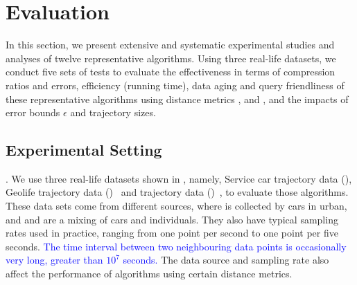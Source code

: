 \section{Evaluation} %
\label{sec-exp}
In this section, we present extensive and systematic experimental studies and analyses of twelve representative \lsa algorithms.
Using three real-life datasets, we conduct five sets of tests to evaluate the effectiveness in terms of compression ratios and errors, efficiency (running time), data aging and query friendliness of these representative algorithms using distance metrics \ped, \sed and \dad, and the impacts of error bounds $\epsilon$ and trajectory sizes.
%

\subsection{Experimental Setting}

.
We use three real-life datasets shown in , namely, Service car trajectory data (\ucar), Geolife trajectory data (\geolife)~\cite{Web:Geolife} and \mopsi trajectory data (\mopsi)~\cite{Web:Mopsi}, to evaluate those \lsa algorithms.
These data sets come from different sources, where \ucar is collected by cars in urban, and \geolife and \mopsi are a mixing of cars and individuals. They also have typical sampling rates used in practice, ranging from one point per second to one point per five seconds.
\textcolor{blue}{The time interval between two neighbouring data points is occasionally very long, \eg greater than $10^7$ seconds.}
The data source and sampling rate also affect the performance of \lsa algorithms using certain distance metrics.


